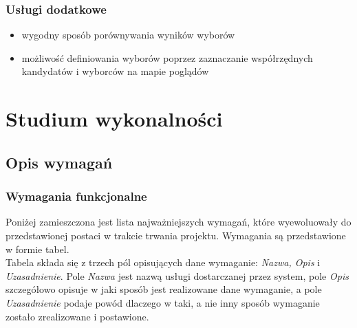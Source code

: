 \documentclass[polish,11pt]{aghthesis}
\begin{document}
\subsubsection{Usługi dodatkowe}
\begin{itemize}
	\item wygodny sposób porównywania wyników wyborów
	\item możliwość definiowania wyborów poprzez zaznaczanie współrzędnych kandydatów i wyborców na 
	mapie poglądów
\end{itemize}
\newpage



\section{Studium wykonalności}
  
\subsection{Opis wymagań}

\subsubsection{Wymagania funkcjonalne}
Poniżej zamieszczona jest lista najważniejszych wymagań, które wyewoluowały do przedstawionej postaci w trakcie trwania projektu. Wymagania są przedstawione w formie tabel.\\
Tabela składa się z trzech pól opisujących dane wymaganie: \textit{Nazwa, Opis} i \textit{Uzasadnienie}. Pole \textit{Nazwa} jest nazwą usługi dostarczanej przez system, pole \textit{Opis} szczegółowo opisuje w jaki sposób jest realizowane dane wymaganie, a pole \textit{Uzasadnienie} podaje powód dlaczego w taki, a nie inny sposób wymaganie zostało zrealizowane i postawione. \\
\end{document}
